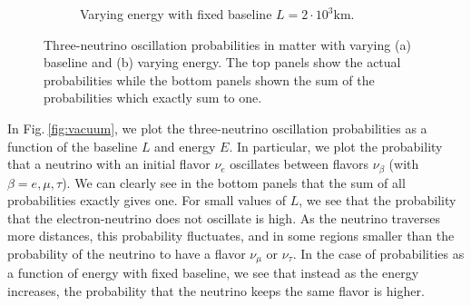 \documentclass[twocolumn,secnumarabic,amssymb, nobibnotes, aps, prd,10pt]{revtex4-1}
\newcommand{\Fig}[1]{Fig.$\:$\ref{#1}}
\begin{document}
\begin{figure}
\begin{subfigure}{1.05\linewidth}
\caption{Varying energy with fixed baseline $L=2 \cdot 10^3 \mathrm{km}$.} 
\label{fig:matter} 
\end{subfigure}
\caption{Three-neutrino oscillation probabilities in matter with varying (a) baseline
and (b) varying energy. The top panels show the actual probabilities while the bottom
panels shown the sum of the probabilities which exactly sum to one.}
\end{figure}
In \Fig{fig:vacuum}, we plot the three-neutrino oscillation probabilities as a function of
the baseline $L$ and energy $E$. In particular, we plot the probability that a neutrino
with an initial flavor $\nu_e$ oscillates between flavors $\nu_\beta$ (with $\beta = e,
\mu, \tau$). We can clearly see in the bottom panels that the sum of all probabilities
exactly gives one. For small values of $L$, we see that the probability that the 
electron-neutrino does not oscillate is high. As the neutrino traverses more distances,
this probability fluctuates, and in some regions smaller than the probability of the
neutrino to have a flavor $\nu_\mu$ or $\nu_\tau$. In the case of probabilities as a
function of energy with fixed baseline, we see that instead as the energy increases, the
probability that the neutrino keeps the same flavor is higher.
\end{document}
